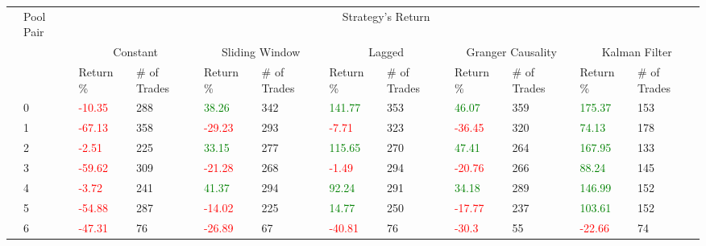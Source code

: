 \begin{table}[H]
    \centering
    \begin{adjustwidth}{-0.8in}{-0.9in}
        \begin{tabular}{|p{2em}|p{2em}|p{3em}|p{3em}|p{3em}|p{3em}|p{3em}|p{3em}|p{3em}|p{3em}|p{3em}|p{3em}|}\hline
            & Pool Pair & \multicolumn{10}{|c|}{Strategy's Return} \\\cline{3-12}
            &   & \multicolumn{2}{|c|}{Constant} & \multicolumn{2}{|c|}{Sliding Window} & \multicolumn{2}{|c|}{Lagged} & \multicolumn{2}{|c|}{Granger Causality} & \multicolumn{2}{|c|}{Kalman Filter}\\\cline{3-12}
            & & Return \% & \# of Trades & Return \% & \# of Trades & Return \% & \# of Trades & Return \% & \# of Trades & Return \% & \# of Trades\\\hline
            
            \parbox[t]{4em}{} & 0 & \textcolor{red}{-10.35} & 288 & \textcolor{green}{38.26} & 342 & \textcolor{green}{141.77} & 353 & \textcolor{green}{46.07} & 359 & \textcolor{green}{175.37} & 153\\
            & 1 & \textcolor{red}{-67.13} & 358 & \textcolor{red}{-29.23} & 293 & \textcolor{red}{-7.71} & 323 & \textcolor{red}{-36.45} & 320 & \textcolor{green}{74.13} & 178\\
            & 2 & \textcolor{red}{-2.51} & 225 & \textcolor{green}{33.15} & 277 & \textcolor{green}{115.65} & 270 & \textcolor{green}{47.41} & 264 & \textcolor{green}{167.95} & 133\\
            & 3 & \textcolor{red}{-59.62} & 309 & \textcolor{red}{-21.28} & 268 & \textcolor{red}{-1.49} & 294 & \textcolor{red}{-20.76} & 266 & \textcolor{green}{88.24} & 145\\
            & 4 & \textcolor{red}{-3.72} & 241 & \textcolor{green}{41.37} & 294 & \textcolor{green}{92.24} & 291 & \textcolor{green}{34.18} & 289 & \textcolor{green}{146.99} & 152\\
            & 5 & \textcolor{red}{-54.88} & 287 & \textcolor{red}{-14.02} & 225 & \textcolor{green}{14.77} & 250 & \textcolor{red}{-17.77} & 237 & \textcolor{green}{103.61} & 152\\
            & 6 & \textcolor{red}{-47.31} & 76 & \textcolor{red}{-26.89} & 67 & \textcolor{red}{-40.81} & 76 & \textcolor{red}{-30.3} & 55 & \textcolor{red}{-22.66} & 74\\\hline\hline


\end{tabular}
\end{adjustwidth}
\end{table}
